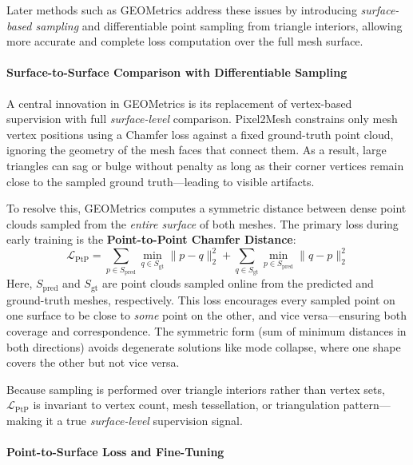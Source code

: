 Later methods such as GEOMetrics address these issues by introducing \emph{surface-based sampling} and differentiable point sampling from triangle interiors, allowing more accurate and complete loss computation over the full mesh surface.

\begin{enrichment}
    
    \paragraph{Surface-to-Surface Comparison with Differentiable Sampling}
    
    A central innovation in GEOMetrics is its replacement of vertex-based supervision with full \emph{surface-level} comparison. Pixel2Mesh constrains only mesh vertex positions using a Chamfer loss against a fixed ground-truth point cloud, ignoring the geometry of the mesh faces that connect them. As a result, large triangles can sag or bulge without penalty as long as their corner vertices remain close to the sampled ground truth—leading to visible artifacts.
    
    To resolve this, GEOMetrics computes a symmetric distance between dense point clouds sampled from the \emph{entire surface} of both meshes. The primary loss during early training is the \textbf{Point-to-Point Chamfer Distance}:
    \[
    \mathcal{L}_{\text{PtP}} = \sum_{p \in S_{\text{pred}}} \min_{q \in S_{\text{gt}}} \|p - q\|_2^2 + \sum_{q \in S_{\text{gt}}} \min_{p \in S_{\text{pred}}} \|q - p\|_2^2
    \]
    Here, \( S_{\text{pred}} \) and \( S_{\text{gt}} \) are point clouds sampled online from the predicted and ground-truth meshes, respectively. This loss encourages every sampled point on one surface to be close to \emph{some} point on the other, and vice versa—ensuring both coverage and correspondence. The symmetric form (sum of minimum distances in both directions) avoids degenerate solutions like mode collapse, where one shape covers the other but not vice versa.
    
    Because sampling is performed over triangle interiors rather than vertex sets, \( \mathcal{L}_{\text{PtP}} \) is invariant to vertex count, mesh tessellation, or triangulation pattern—making it a true \emph{surface-level} supervision signal.
    
    \paragraph{Point-to-Surface Loss and Fine-Tuning}
    

\end{enrichment}
